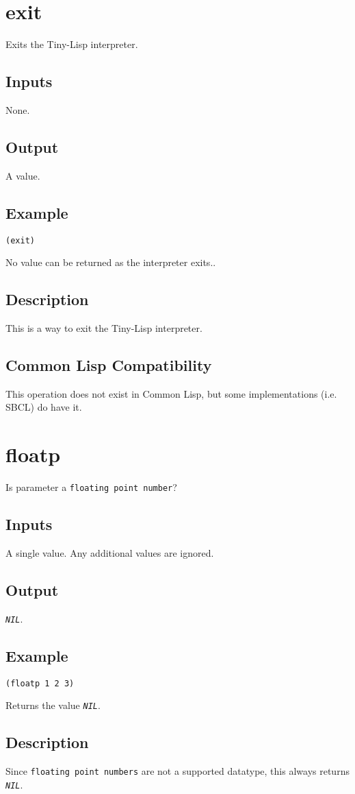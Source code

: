 \documentclass[10pt, openany]{book}
\newcommand{\constant}[1]{\emph{\texttt{#1}}}
\newcommand{\datatype}[1]{\texttt{#1}}
\newcommand{\tl}{Tiny-Lisp}
\newcommand{\cl}{Common Lisp}
\begin{document}
\section{exit}
Exits the \tl{} interpreter.
\subsection{Inputs}
None.
\subsection{Output}
A value.
\subsection{Example}
\begin{lstlisting}
(exit)
\end{lstlisting}
No value can be returned as the interpreter exits..
\subsection{Description}
This is a way to exit the \tl{} interpreter.
\subsection{Common Lisp Compatibility}
This operation does not exist in \cl, but some implementations (i.e. SBCL) do have it.

\section{floatp}
Is parameter a \datatype{floating point number}?
\subsection{Inputs}
A single value.  Any additional values are ignored.
\subsection{Output}
\constant{NIL}.
\subsection{Example}
\begin{lstlisting}
(floatp 1 2 3)
\end{lstlisting}
Returns the value \constant{NIL}.
\subsection{Description}
Since \datatype{floating point numbers} are not a supported datatype, this always returns \constant{NIL}.
\end{document}
